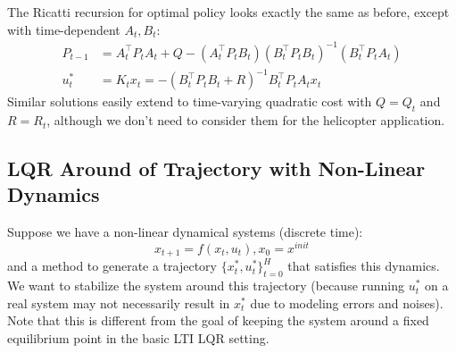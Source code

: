 \documentclass[a4paper]{article}
\begin{document}
The Ricatti recursion for optimal policy looks exactly the same as before, except with time-dependent $A_t, B_t$:
\begin{align}
P_{t-1} &= A_t^\intercal P_tA_t+Q-(A_t^\intercal P_t B_t)(B_t^\intercal P_t B_t)^{-1}(B_t^\intercal P_t A_t) \\
u^*_t &= K_t x_t = -(B_t^\intercal P_tB_t+R)^{-1}B_t^\intercal P_tA_tx_t
\end{align}
Similar solutions easily extend to time-varying quadratic cost with $Q=Q_t$ and $R=R_t$, although we don't need to consider them for the helicopter application. 

\subsection{LQR Around of Trajectory with Non-Linear Dynamics}
\label{linearize_lqr}
Suppose we have a non-linear dynamical systems (discrete time):
\begin{equation}
x_{t+1} = f(x_t,u_t), x_0 = x^{init}
\end{equation}
and a method to generate a trajectory $\{x^*_t, u^*_t \}_{t=0}^H$ that satisfies this dynamics. We want to stabilize the system around this trajectory (because running $u^*_t$ on a real system may not necessarily result in $x^*_t$ due to modeling errors and noises). Note that this is different from the goal of keeping the system around a fixed equilibrium point in the basic LTI LQR setting. 
\end{document}
